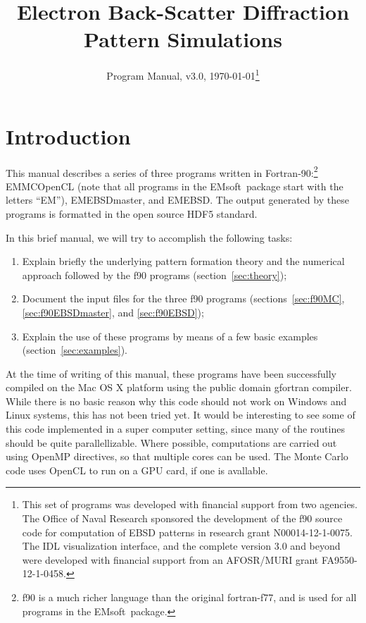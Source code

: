 \documentclass[DIV=calc, paper=letter, fontsize=11pt]{scrartcl}	 %
\title{Electron Back-Scatter Diffraction Pattern Simulations} %
\author{\vspace*{-0.7in}} %
\date{Program Manual, v3.0, \today\protect\footnote{This set of programs was developed with financial support from two agencies. 
The Office of Naval Research sponsored the development of the f90 source code for computation of EBSD patterns in research 
grant N00014-12-1-0075.  The IDL visualization interface, and the complete version 3.0 and beyond were developed with financial 
support from an AFOSR/MURI grant FA9550-12-1-0458.}}
\newcommand{\ctp}{\textsf{EMsoft}}
\begin{document}
\maketitle

\begin{figure}[h]
\leavevmode\centering
{}
\end{figure}

\renewcommand{\contentsname}{Table of Contents}
{\small\tableofcontents}

\newpage
\section{Introduction}
This manual describes a series of three programs written in Fortran-90:\footnote{f90 is a much richer language than the original fortran-f77, and is
used for all programs in the \ctp\ package.} 
\textsf{EMMCOpenCL} (note that all programs in the \ctp\ package start with the letters ``EM''), \textsf{EMEBSDmaster},
and \textsf{EMEBSD}.
The output generated by these programs is formatted in the open source HDF5 standard.

In this brief manual, we will try to accomplish the following tasks:
\begin{enumerate}
	\item Explain briefly the underlying pattern formation theory and the numerical approach followed by the f90 programs (section~\ref{sec:theory});
	\item Document the input files for the three f90 programs (sections~\ref{sec:f90MC}, \ref{sec:f90EBSDmaster}, and \ref{sec:f90EBSD});
	\item Explain the use of these programs by means of a few basic examples (section~\ref{sec:examples}).
\end{enumerate}

At the time of writing of this manual, these programs have been successfully compiled on the Mac OS X platform using the public domain gfortran compiler.  
While there is no basic reason why this code should not work on Windows and Linux systems, this has not been tried yet.
It would be interesting to see some of this code implemented in a super computer setting, since many of the routines should be quite parallellizable.  Where possible, computations
are carried out using OpenMP directives, so that multiple cores can be used.  The Monte Carlo code uses OpenCL to run on a GPU card, if one is avallable.
\end{document}
